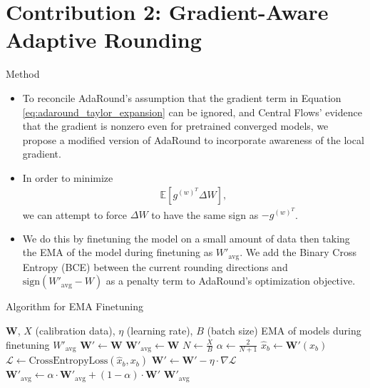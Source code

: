 \documentclass{beamer}
\begin{document}
\section{Contribution 2: Gradient-Aware Adaptive Rounding}
\begin{frame}{Method}
  \begin{itemize}
    \item To reconcile AdaRound's assumption that the gradient term in Equation \ref{eq:adaround_taylor_expansion} can be ignored, and Central Flows' evidence that the gradient is nonzero even for pretrained converged models, we propose a modified version of AdaRound to incorporate awareness of the local gradient.
    \item In order to minimize
\begin{align}
    \mathbb{E} \left[ g^{(w)^T} \Delta W \right],
\end{align}
we can attempt to force $\Delta W$ to have the same sign as $-g^{(w)^T}$. 
\item We do this by finetuning the model on a small amount of data then taking the EMA of the model during finetuning as $W'_{\text{avg}}$. We add the Binary Cross Entropy (BCE) between the current rounding directions and $\text{sign}(W'_{\text{avg}} - W)$ as a penalty term to AdaRound's optimization objective. 
  \end{itemize}
\end{frame}
\begin{frame}{Algorithm for EMA Finetuning}
\begin{algorithm}[H]
\caption{Gradient-Aware Adaptive Rounding (Finetuning)}\label{alg:gradient_aware_adaround_finetuning}
\begin{algorithmic}[1]
\Require $\mathbf{W}$, $X$ (calibration data), $\eta$ (learning rate), $B$ (batch size)
\Ensure EMA of models during finetuning $W'_{\text{avg}}$
\State $\mathbf{W}' \gets \mathbf{W}$
\State $\mathbf{W}'_{\text{avg}} \gets \mathbf{W}$
\State $N \gets \frac{X}{B}$ 
\State $\alpha \gets \frac{2}{N+1}$ 
    \State $\hat{x}_b \gets \mathbf{W}'(x_b)$ 
    \State $\mathcal{L} \gets \text{CrossEntropyLoss}(\hat{x}_b, x_b)$
    \State $\mathbf{W}' \gets \mathbf{W}' - \eta \cdot \nabla \mathcal{L}$ 
    \State $\mathbf{W}'_{\text{avg}} \gets \alpha \cdot \mathbf{W}'_{\text{avg}} + (1 - \alpha) \cdot \mathbf{W}'$ 
\EndFor
\State \Return $\mathbf{W}'_{\text{avg}}$
\end{algorithmic}
\end{algorithm}
\end{frame}
\end{document}
